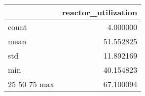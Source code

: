 \begin{tabular}{lr}
\toprule
 & reactor\_utilization \\
\midrule
count & 4.000000 \\
mean & 51.552825 \\
std & 11.892169 \\
min & 40.154823 \\
25%
50%
75%
max & 67.100094 \\
\bottomrule
\end{tabular}

